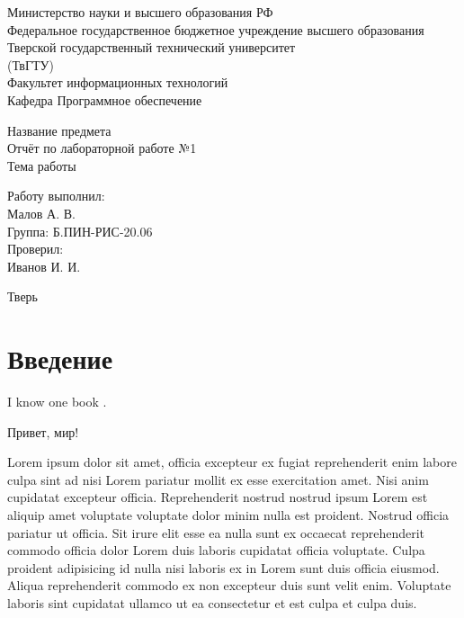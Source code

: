 \documentclass[14pt,a4paper]{extarticle}
\newcommand{\asection}[1]{
	\section*{#1}
	\addcontentsline{toc}{section}{#1}
}
\begin{document}
\begin{titlepage}
	\begin{center}
		Министерство науки и высшего образования РФ\\
		Федеральное государственное бюджетное учреждение высшего образования\\
		Тверской государственный технический университет\\
		(ТвГТУ)\\
		Факультет информационных технологий\\
		Кафедра Программное обеспечение
		\vspace{6cm}

		Название предмета\\
		Отчёт по лабораторной работе №1\\
		Тема работы
		\vspace{3cm}

		\begin{flushright}
			\begin{minipage}{0.25\textwidth}
				\begin{flushleft}

					Работу выполнил:\\
					Малов А. В. \\
					Группа: Б.ПИН-РИС-20.06\\

					Проверил:\\
					Иванов И. И.

				\end{flushleft}
			\end{minipage}
		\end{flushright}

		\vfill
		Тверь

		\the\year{}
	\end{center}
\end{titlepage}
\newpage

\tableofcontents
\newpage

\asection{Введение}

I know one book \cite{west2004}.

Привет, мир!

Lorem ipsum dolor sit amet, officia excepteur ex fugiat reprehenderit enim
labore culpa sint ad nisi Lorem pariatur mollit ex esse exercitation amet. Nisi
anim cupidatat excepteur officia. Reprehenderit nostrud nostrud ipsum Lorem est
aliquip amet voluptate voluptate dolor minim nulla est proident. Nostrud
officia pariatur ut officia. Sit irure elit esse ea nulla sunt ex occaecat
reprehenderit commodo officia dolor Lorem duis laboris cupidatat officia
voluptate. Culpa proident adipisicing id nulla nisi laboris ex in Lorem sunt
duis officia eiusmod. Aliqua reprehenderit commodo ex non excepteur duis sunt
velit enim. Voluptate laboris sint cupidatat ullamco ut ea consectetur et est
culpa et culpa duis.
\end{document}

